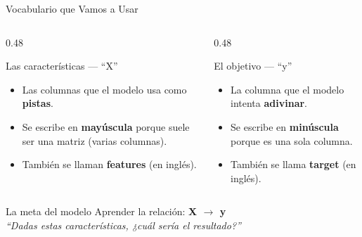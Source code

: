 \documentclass[aspectratio=169]{beamer}
\begin{document}
\begin{frame}{Vocabulario que Vamos a Usar}
  \small
  \begin{columns}[T]
    \begin{column}{0.48\textwidth}
      \begin{block}{\faList\enspace Las características --- ``X''}
        \small
        \begin{itemize}\setlength\itemsep{3pt}
          \item Las columnas que el modelo usa como \textbf{pistas}.
          \item Se escribe en \textbf{mayúscula} porque suele ser una matriz (varias columnas).
          \item También se llaman \textbf{features} (en inglés).
        \end{itemize}
      \end{block}
    \end{column}
    \begin{column}{0.48\textwidth}
      \begin{alertblock}{\faBullseye\enspace El objetivo --- ``y''}
        \small
        \begin{itemize}\setlength\itemsep{3pt}
          \item La columna que el modelo intenta \textbf{adivinar}.
          \item Se escribe en \textbf{minúscula} porque es una sola columna.
          \item También se llama \textbf{target} (en inglés).
        \end{itemize}
      \end{alertblock}
    \end{column}
  \end{columns}
  \vspace{0.25cm}
  \begin{conceptbox}{\faArrowRight\enspace La meta del modelo}
    \centering\small
    Aprender la relación: \textbf{X $\rightarrow$ y}\\[3pt]
    \textit{``Dadas estas características, ¿cuál sería el resultado?''}
  \end{conceptbox}
\end{frame}

\end{document}
